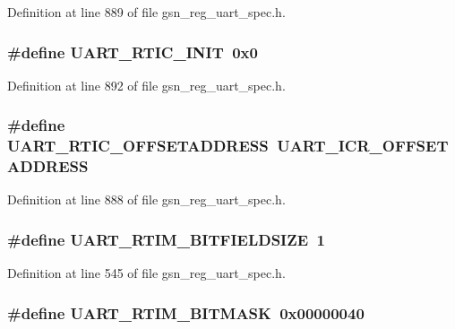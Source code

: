 Definition at line 889 of file gsn\_\-reg\_\-uart\_\-spec.h.

\hypertarget{a00575_a935704bd49999ac4d399dbc965fe0ed2}{
\subsubsection[{UART\_\-RTIC\_\-INIT}]{\setlength{\rightskip}{0pt plus 5cm}\#define UART\_\-RTIC\_\-INIT~0x0}}
\label{a00575_a935704bd49999ac4d399dbc965fe0ed2}


Definition at line 892 of file gsn\_\-reg\_\-uart\_\-spec.h.

\hypertarget{a00575_a7a6dddeb1367d7f40535315b0872df1a}{
\subsubsection[{UART\_\-RTIC\_\-OFFSETADDRESS}]{\setlength{\rightskip}{0pt plus 5cm}\#define UART\_\-RTIC\_\-OFFSETADDRESS~UART\_\-ICR\_\-OFFSETADDRESS}}
\label{a00575_a7a6dddeb1367d7f40535315b0872df1a}


Definition at line 888 of file gsn\_\-reg\_\-uart\_\-spec.h.

\hypertarget{a00575_add62d107268647a8a9f81223c6c6ba9f}{
\subsubsection[{UART\_\-RTIM\_\-BITFIELDSIZE}]{\setlength{\rightskip}{0pt plus 5cm}\#define UART\_\-RTIM\_\-BITFIELDSIZE~1}}
\label{a00575_add62d107268647a8a9f81223c6c6ba9f}


Definition at line 545 of file gsn\_\-reg\_\-uart\_\-spec.h.

\hypertarget{a00575_ad7bf00b60838c3dfd9218e9eeca7b0ec}{
\subsubsection[{UART\_\-RTIM\_\-BITMASK}]{\setlength{\rightskip}{0pt plus 5cm}\#define UART\_\-RTIM\_\-BITMASK~0x00000040}}
\label{a00575_ad7bf00b60838c3dfd9218e9eeca7b0ec}


